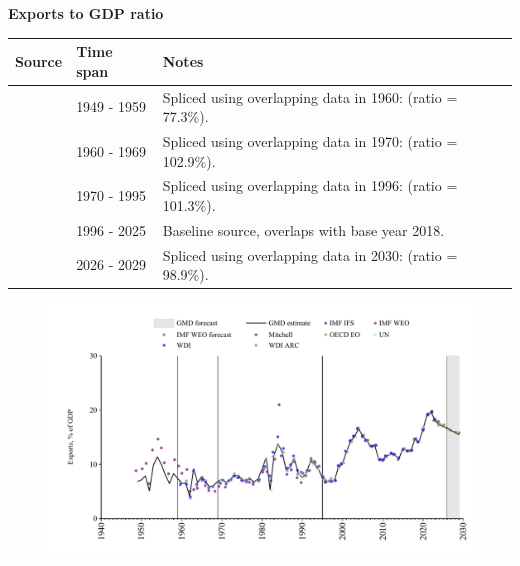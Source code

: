 \documentclass[12pt,a4paper,landscape]{article}
\begin{document}
\begin{adjustbox}{max totalsize={\paperwidth}{\paperheight},center}
\begin{minipage}[t][\textheight][t]{\textwidth}
\vspace*{0.5cm}
{}
\begin{center}
{\Large\bfseries Exports to GDP ratio}
\end{center}
\vspace{0.5cm}
\begin{table}[H]
\centering
\small
\begin{tabular}{|l|l|l|}
\hline
\textbf{Source} & \textbf{Time span} & \textbf{Notes} \\
\hline
\rowcolor{white}\cite{Mitchell}& 1949 - 1959 &Spliced using overlapping data in 1960: (ratio = 77.3\%). \\
\rowcolor{lightgray}\cite{WDI}& 1960 - 1969 &Spliced using overlapping data in 1970: (ratio = 102.9\%). \\
\rowcolor{white}\cite{UN}& 1970 - 1995 &Spliced using overlapping data in 1996: (ratio = 101.3\%). \\
\rowcolor{lightgray}\cite{OECD_EO}& 1996 - 2025 &Baseline source, overlaps with base year 2018. \\
\rowcolor{white}\cite{IMF_WEO_forecast}& 2026 - 2029 &Spliced using overlapping data in 2030: (ratio = 98.9\%). \\
\hline
\end{tabular}
\end{table}
\begin{figure}[H]
\centering
\includegraphics[width=\textwidth,height=0.6\textheight,keepaspectratio]{graphs/BRA_exports_GDP.pdf}
\end{figure}
\end{minipage}
\end{adjustbox}
\end{document}
